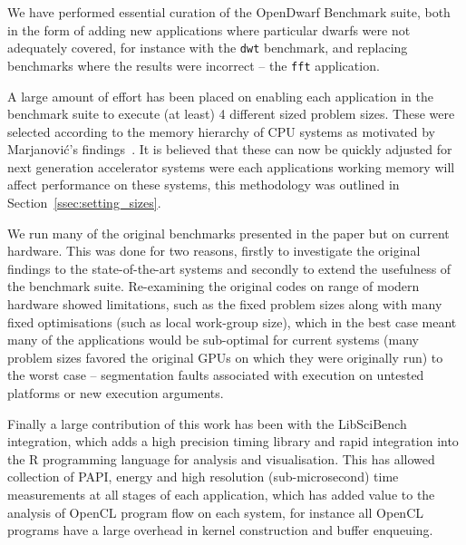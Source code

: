\documentclass[../document.tex]{subfiles}
\begin{document}
\label{sec:conclusions}

We have performed essential curation of the OpenDwarf Benchmark suite, both in the form of adding new applications where particular dwarfs were not adequately covered, for instance with the {\tt dwt} benchmark, and replacing benchmarks where the results were incorrect -- the {\tt fft} application.

A large amount of effort has been placed on enabling each application in the benchmark suite to execute (at least) 4 different sized problem sizes.
These were selected according to the memory hierarchy of CPU systems as motivated by Marjanovi{\'c}'s findings~\cite{marjanovic2016hpc}.
It is believed that these can now be quickly adjusted for next generation accelerator systems were each applications working memory will affect performance on these systems, this methodology was outlined in Section~\ref{ssec:setting_sizes}.

We run many of the original benchmarks presented in the  paper but on current hardware.
This was done for two reasons, firstly to investigate the original findings to the state-of-the-art systems and secondly to extend the usefulness of the benchmark suite.
Re-examining the original codes on range of modern hardware showed limitations, such as the fixed problem sizes along with many fixed optimisations (such as local work-group size), which in the best case meant many of the applications would be sub-optimal for current systems (many problem sizes favored the original GPUs on which they were originally run) to the worst case -- segmentation faults associated with execution on untested platforms or new execution arguments.

Finally a large contribution of this work has been with the LibSciBench integration, which adds a high precision timing library and rapid integration into the R programming language for analysis and visualisation.
This has allowed collection of PAPI, energy and high resolution (sub-microsecond) time measurements at all stages of each application, which has added value to the analysis of OpenCL program flow on each system, for instance all OpenCL programs have a large overhead in kernel construction and buffer enqueuing.
\end{document}
